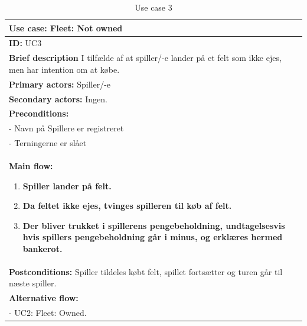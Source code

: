 \begin{table}[H]
    \begin{center}
        \begin{tabular}{ | p{15cm} |}
            \hline
            \textbf{Use case:} Fleet: Not owned \\ \hline
            \textbf{ID:} UC3 \\ \hline
            \textbf{Brief description} I tilfælde af at spiller/-e lander på et felt som ikke ejes, men har intention om at købe.    \\ \hline
            \textbf{Primary actors:} Spiller/-e \\ \hline
            \textbf{Secondary actors:} Ingen. \\ \hline
            \textbf{Preconditions:}
            \\- Navn på Spillere er registreret
            \\- Terningerne er slået \\ \hline
            \textbf{Main flow:}
            \begin{enumerate}
                \item \textbf{Spiller lander på felt.}
                \item \textbf{Da feltet ikke ejes, tvinges spilleren til køb af felt.}
                \item \textbf{Der bliver trukket i spillerens pengebeholdning, undtagelsesvis hvis spillers pengebeholdning går i minus, og erklæres hermed bankerot.}
            \end{enumerate} \\ \hline
            \textbf{Postconditions:} Spiller tildeles købt felt, spillet fortsætter og turen går til næste spiller.\\ \hline
            \textbf{Alternative flow:}
            \\- UC2: Fleet: Owned.\\ \hline
            \hline
        \end{tabular}
        \caption{Use case 3}
        \label{usecase:3}
    \end{center}
\end{table}

\newpage


